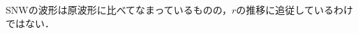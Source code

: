 \documentclass[twocolumn,oneside,a4paper]{article}
\begin{document}

SNWの波形は原波形に比べてなまっているものの，$r$の推移に追従しているわけではない．


%
%
%
%
\end{document}
